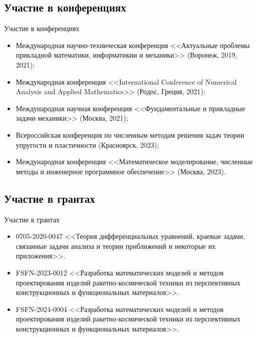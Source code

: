 \subsection{Участие в конференциях}
\begin{frame}{Участие в конференциях}
    \begin{itemize}
    \justifying
        \item Международная научно-техническая конференция <<Актуальные проблемы прикладной математики, информатикии и механики>> (Воронеж, 2019, 2021);
        \item Международная конференция <<International Conference of Nume\-rical Analysis and Applied Mathematics>> (Родос, Греция, 2021);
        \item Международная научная конференция <<Фундаментальные и прикладные задачи механики>> (Москва, 2021);
        \item Всероссийская конференция по численным методам решения задач теории упругости и пластичности (Красноярск, 2023);
        \item Международная конференция <<Математическое моделирование, численные методы и инженерное программное обеспечение>> (Москва, 2023).
    \end{itemize}
\end{frame}

\subsection{Участие в грантах}
\begin{frame}{Участие в грантах}
    \begin{itemize}
    \justifying
        \item 0705-2020-0047 <<Теория дифференциальных уравнений, краевые задачи, связанные задачи анализа и теории приближений и некоторые их приложения>>.
	\item FSFN-2023-0012 <<Разработка математических моделей и методов проектирования изделий ракетно-космической техники из перспективных конструкционных и функциональных материалов>>.
	\item FSFN-2024-0004 <<Разработка математических моделей и методов проектирования изделий ракетно-космической техники из перспективных конструкционных и функциональных материалов>>.
    \end{itemize}
\end{frame}

